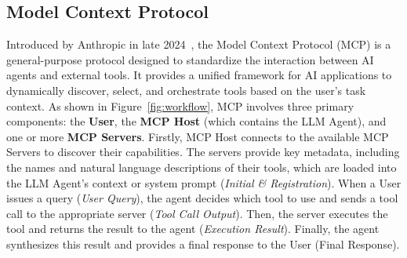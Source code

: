 \subsection{Model Context Protocol}
Introduced by Anthropic in late 2024~\cite{Anthropic_MCP_2024}, the Model Context Protocol (MCP) is a general-purpose protocol designed to standardize the interaction between AI agents and external tools. It provides a unified framework for AI applications to dynamically discover, select, and orchestrate tools based on the user's task context.
As shown in Figure~\ref{fig:workflow}, MCP involves three primary components: the \textbf{User}, the \textbf{MCP Host} (which contains the LLM Agent), and one or more \textbf{MCP Servers}. Firstly, MCP Host connects to the available MCP Servers to discover their capabilities. The servers provide key metadata, including the names and natural language descriptions of their tools, which are loaded into the LLM Agent's context or system prompt (\textit{Initial \& Registration}). When a User issues a query (\textit{User Query}), the agent decides which tool to use and sends a tool call to the appropriate server (\textit{Tool Call Output}). Then, the server executes the tool and returns the result to the agent (\textit{Execution Result}). Finally, the agent synthesizes this result and provides a final response to the User (Final Response).


